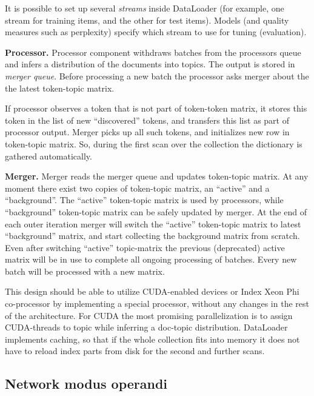 \documentclass[11pt,a4paper,twoside]{report}
\begin{document}
It is possible to set up several \emph{streams} inside DataLoader
(for example, one stream for training items, and the other for test items).
Models (and quality measures such as perplexity) specify which stream to use for tuning (evaluation).

\textbf{Processor.} Processor component withdraws batches from the processors queue
and infers a distribution of the documents into topics.
The output is stored in \emph{merger queue}.
Before processing a new batch the processor asks merger about the the latest token-topic matrix.

If processor observes a token that is not part of token-token matrix, it stores this token in the list of
new ``discovered'' tokens, and transfers this list as part of processor output.
Merger picks up all such tokens, and initializes new row in token-topic matrix.
So, during the first scan over the collection the dictionary is gathered automatically.

\textbf{Merger.}
Merger reads the merger queue and updates token-topic matrix.
At any moment there exist two copies of token-topic matrix,
an ``active'' and a ``background''.
The ``active'' token-topic matrix is used by processors,
while ``background'' token-topic matrix can be safely updated by merger.
At the end of each outer iteration merger will switch the ``active''
token-topic matrix to latest ``background'' matrix,
and start collecting the background matrix from scratch.
Even after switching ``active'' topic-matrix the previous (deprecated) active matrix
will be in use to complete all ongoing processing of batches.
Every new batch will be processed with a new matrix.

This design should be able to utilize CUDA-enabled devices or Index Xeon Phi co-processor
by implementing a special processor, without any changes in the rest of the architecture.
For CUDA the most promising parallelization is to assign CUDA-threads to topic
while inferring a doc-topic distribution.
DataLoader implements caching, so that if the whole collection fits into memory
it does not have to reload index parts from disk for the second and further scans.

\subsection{Network modus operandi}
\label{label:network_modus_operandi}
\end{document}
